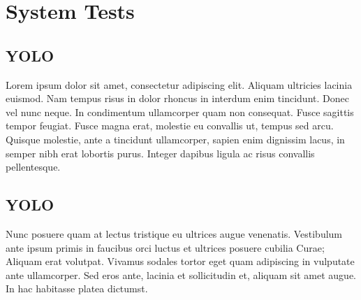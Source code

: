 
\chapter{System Tests} %

\label{Chapter7} %



\section{YOLO}

Lorem ipsum dolor sit amet, consectetur adipiscing elit. Aliquam ultricies lacinia euismod. Nam tempus risus in dolor rhoncus in interdum enim tincidunt. Donec vel nunc neque. In condimentum ullamcorper quam non consequat. Fusce sagittis tempor feugiat. Fusce magna erat, molestie eu convallis ut, tempus sed arcu. Quisque molestie, ante a tincidunt ullamcorper, sapien enim dignissim lacus, in semper nibh erat lobortis purus. Integer dapibus ligula ac risus convallis pellentesque.

\section{YOLO}

Nunc posuere quam at lectus tristique eu ultrices augue venenatis. Vestibulum ante ipsum primis in faucibus orci luctus et ultrices posuere cubilia Curae; Aliquam erat volutpat. Vivamus sodales tortor eget quam adipiscing in vulputate ante ullamcorper. Sed eros ante, lacinia et sollicitudin et, aliquam sit amet augue. In hac habitasse platea dictumst.